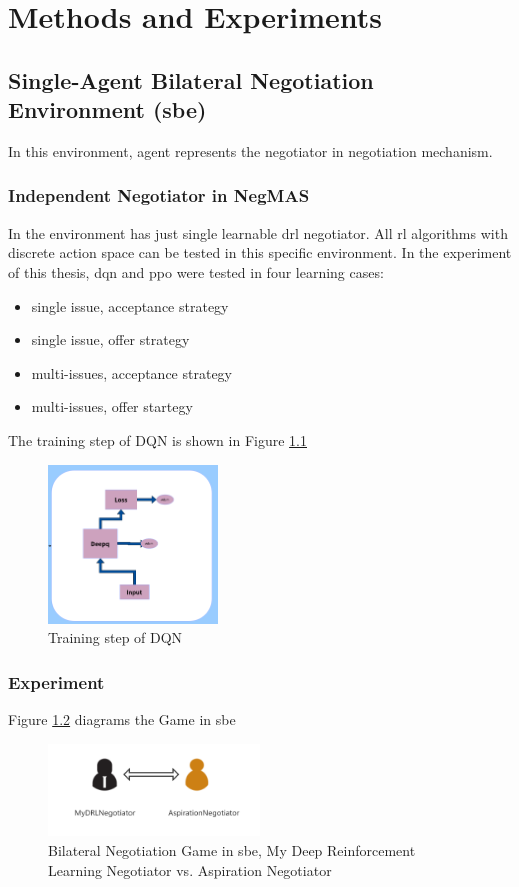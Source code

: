 \chapter{Methods and Experiments} \label{methods-and-experiments}

\section{Single-Agent Bilateral Negotiation Environment (\gls{sbe})}
In this environment, agent represents the negotiator in negotiation mechanism.

\subsection{Independent Negotiator in NegMAS}
In the environment has just single learnable \gls{drl} negotiator. All \gls{rl} algorithms with discrete action space can be tested in this specific environment. In the experiment of this thesis, \gls{dqn} and \gls{ppo} were tested in four learning cases:
\begin{itemize}
	\item single issue, acceptance strategy
	\item single issue, offer strategy
	\item multi-issues, acceptance strategy
	\item multi-issues, offer startegy
\end{itemize}

The training step of DQN is shown in Figure \ref{fig:dqn}
\begin{figure}[htbp]
\centering
\includegraphics[width=0.40\textwidth]{./images/dqn.png}
\caption{Training step of DQN}
\label{fig:dqn}
\end{figure}

\subsection{Experiment} \label{sbe:experiment}
Figure \ref{fig:bilateral-negotiation} diagrams the Game in \gls{sbe}
\begin{figure}[htbp]
\centering
\includegraphics[width=0.50\textwidth]{./images/bilateral-negotiation.png}
\caption{Bilateral Negotiation Game in \gls{sbe}, My Deep Reinforcement Learning Negotiator vs. Aspiration Negotiator}
\label{fig:bilateral-negotiation}
\end{figure}

